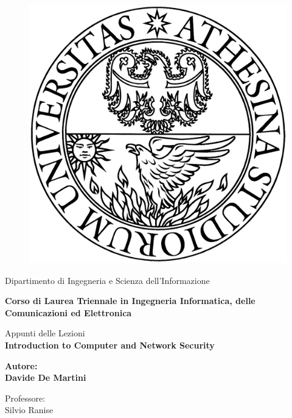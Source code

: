 \begin{titlepage} %
\begin{figure}[t] %
    \centering\includegraphics[scale=0.1]{images/unitn.png}
\end{figure}
\vspace{20mm}

\begin{Large}
 \begin{center}
	Dipartimento di Ingegneria e Scienza dell'Informazione
	
	\textbf{Corso di Laurea Triennale in Ingegneria Informatica, delle Comunicazioni ed Elettronica}
	
	\vspace{5mm}

    \hrulefill
    
    \vspace{25mm}
	
    {\LARGE{Appunti delle Lezioni}}\\
	\vspace{10mm}
	{\huge{\bf Introduction to Computer and Network Security}}\\
\end{center}
\end{Large}


\vspace{36mm}
\begin{minipage}[t]{0.47\textwidth}
	{\large{\bf Autore:\\Davide De Martini}}
\end{minipage}
\hfill
\begin{minipage}[t]{0.47\textwidth}\raggedleft
	{\large{Professore: \\Silvio Ranise}}
\end{minipage}

\vspace{25mm}

\hrulefill

\vspace{5mm}


\end{titlepage}